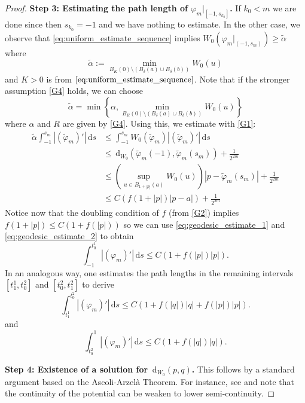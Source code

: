 \documentclass[a4paper, 11pt, reqno]{amsart}
\theoremstyle{plain}
\theoremstyle{definition}
\theoremstyle{remark}
\newcommand{\dd}{\,\mathrm{d}}
\begin{document}
\begin{proof}
    \textbf{Step 3: Estimating the path length of $\varphi_m|_{[-1, s_{k_0}]}$.} 
    If $k_0 < m$ we are done since then $s_{k_0} = -1$ and we have nothing to estimate. In the other case, we observe that \eqref{eq:uniform_estimate_sequence} implies $W_0(\varphi_m|_{(-1, s_m)}) \geq \tilde \alpha$ where 
    $$\tilde \alpha := \min_{B_K(0)\setminus(B_\delta(a)\cup B_\delta(b))}W_0(u)$$
    and $K > 0$ is from $\eqref{eq:uniform_estimate_sequence}$.
    Note that if the stronger assumption \ref{G4} holds, we can choose 
    \[
        \tilde \alpha = \min\left\{ \alpha, \min_{B_R(0)\setminus(B_\delta(a)\cup B_\delta(b))}W_0(u) \right\}
    \]
    where $\alpha$ and $R$ are given by \ref{G4}.
    Using this, we estimate with \ref{G1}: 
    \begin{align}\label{eq:geodesic_estimate_2}
        \tilde \alpha \int_{-1}^{s_{m}} |(\tilde \varphi_m)'| \, \mathrm{d}s &\leq \int_{-1}^{s_m} W_0(\tilde \varphi_m)|(\tilde \varphi_m)'|\, \mathrm{d}s \nonumber \\
        &\leq \dd_{W_0}\left(\tilde \varphi_m(-1), \tilde \varphi_m( s_{m} )\right) + \frac{1}{2^{2m}} \nonumber \\
        &\leq \left(\sup_{u \in B_{1 + |p|}(a)} W_0(u)\right) |p - \tilde \varphi_m(s_m)| + \frac{1}{2^{2m}} \nonumber \\
        &\leq C \left( f(1 + |p|)|p - a| \right) + \frac{1}{2^{2m}}
    \end{align}
    Notice now that the doubling condition of $f$ (from \ref{G2}) implies $f(1 + |p|) \leq C(1 + f(|p|))$ so we can use \eqref{eq:geodesic_estimate_1} and \eqref{eq:geodesic_estimate_2} to obtain
    \[
        \int_{-1}^{t_0^1} |(\varphi_{m})'| \, \mathrm{d}s \leq C(1 + f(|p|)|p|).
    \]
    In an analogous way, one estimates the path lengths in the remaining intervals $[t_1^1, t_0^2]$ and $[t_0^2, t_1^2]$ to derive 
    \[
        \int_{t_1^1}^{t_0^2} |(\varphi_{m})'| \, \mathrm{d}s \leq C(1 + f(|q|)|q| + f(|p|)|p|).
    \]
    and 
    \[
        \int_{t_0^2}^1 |(\varphi_{m})'| \, \mathrm{d}s \leq C(1 + f(|q|)|q|).
    \]

    \textbf{Step 4: Existence of a solution for $\dd_{W_0}(p,q)$.} 
    This follows by a standard argument based on the Ascoli-Arzel\`{a} Theorem. For instance, see \cite[Lemma 3.1]{CriGra} and note that the continuity of the potential can be weaken to lower semi-continuity.
\end{proof}
\end{document}
